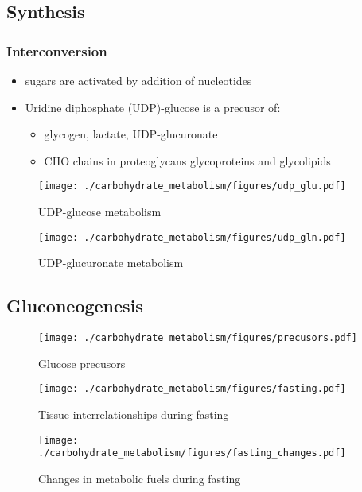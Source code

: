 \documentclass{scrartcl}
\begin{document}
\subsection{Synthesis}
\label{sec:orgbd8a878}
\subsubsection{Interconversion}
\label{sec:orgbf4af43}
\begin{itemize}
\item sugars are activated by addition of nucleotides
\item Uridine diphosphate (UDP)-glucose is a precusor of:
\begin{itemize}
\item glycogen, lactate, UDP-glucuronate
\item CHO chains in proteoglycans glycoproteins and glycolipids
\end{itemize}
\end{itemize}

\begin{figure}[htbp]
\centering
\texttt{[image: ./carbohydrate\_metabolism/figures/udp\_glu.pdf]}
\caption{\label{fig:org0e41c1a}
UDP-glucose metabolism}
\end{figure}

\begin{figure}[htbp]
\centering
\texttt{[image: ./carbohydrate\_metabolism/figures/udp\_gln.pdf]}
\caption{\label{fig:orge613a8a}
UDP-glucuronate metabolism}
\end{figure}

\subsection{Gluconeogenesis}
\label{sec:org2fb0c9d}

\begin{figure}[htbp]
\centering
\texttt{[image: ./carbohydrate\_metabolism/figures/precusors.pdf]}
\caption{\label{fig:org4aec80a}
Glucose precusors}
\end{figure}


\begin{figure}[htbp]
\centering
\texttt{[image: ./carbohydrate\_metabolism/figures/fasting.pdf]}
\caption{\label{fig:orge0282a1}
Tissue interrelationships during fasting}
\end{figure}


\begin{figure}[htbp]
\centering
\texttt{[image: ./carbohydrate\_metabolism/figures/fasting\_changes.pdf]}
\caption{\label{fig:orgd2c9e2a}
Changes in metabolic fuels during fasting}
\end{figure}
\end{document}
